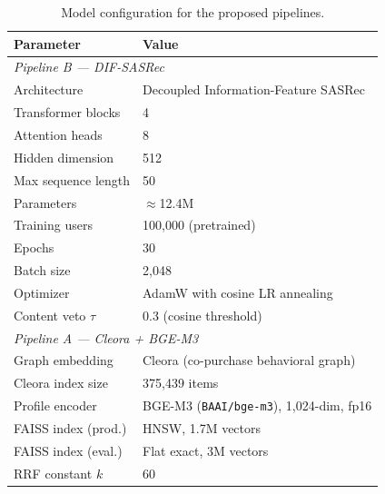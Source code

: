 \begin{table}[H]
\centering
\caption{Model configuration for the proposed pipelines.}
\label{tab:model_config}
\begin{tabular}{p{5.2cm}p{7.8cm}}
\hline
\textbf{Parameter} & \textbf{Value} \\
\hline
\multicolumn{2}{l}{\textit{Pipeline B — DIF-SASRec}} \\
Architecture     & Decoupled Information-Feature SASRec \\
Transformer blocks & 4 \\
Attention heads  & 8 \\
Hidden dimension & 512 \\
Max sequence length & 50 \\
Parameters       & $\approx$12.4M \\
Training users   & 100{,}000 (pretrained) \\
Epochs           & 30 \\
Batch size       & 2{,}048 \\
Optimizer        & AdamW with cosine LR annealing \\
Content veto $\tau$ & 0.3 (cosine threshold) \\
\hline
\multicolumn{2}{l}{\textit{Pipeline A — Cleora + BGE-M3}} \\
Graph embedding  & Cleora (co-purchase behavioral graph) \\
Cleora index size & 375{,}439 items \\
Profile encoder  & BGE-M3 (\texttt{BAAI/bge-m3}), 1{,}024-dim, fp16 \\
FAISS index (prod.) & HNSW, 1.7M vectors \\
FAISS index (eval.) & Flat exact, 3M vectors \\
RRF constant $k$ & 60 \\
\hline
\end{tabular}
\end{table}
